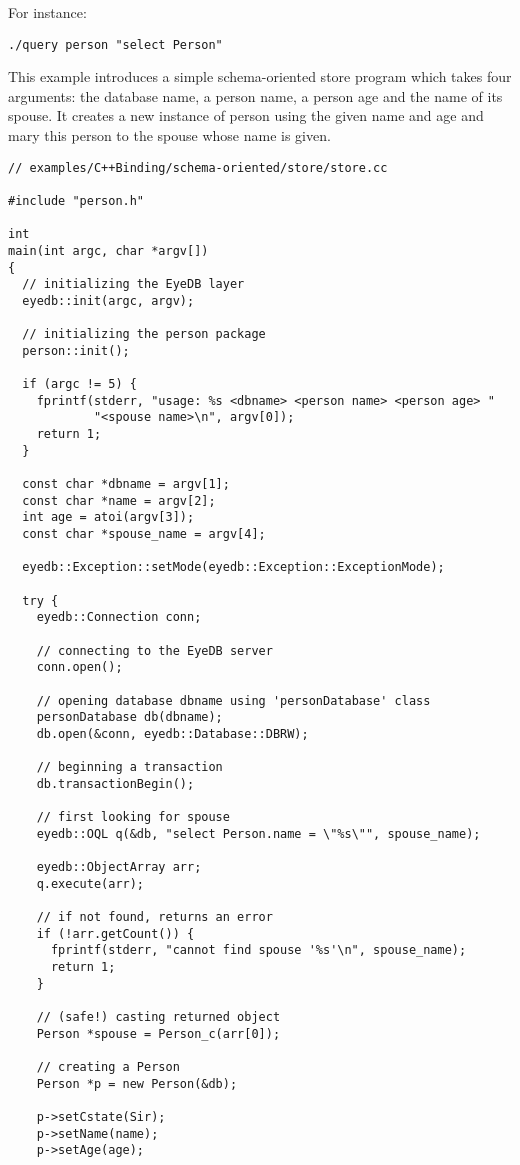 For instance:
\begin{verbatim}
./query person "select Person"
\end{verbatim}
\normalsize
{}
This example introduces a simple schema-oriented store program which takes
four arguments: the database name, a person name, a person age and the
name of its spouse. It
creates a new instance of person using the given name and age and mary
this person to the spouse whose name is given.
\verbsize
\begin{verbatim}
// examples/C++Binding/schema-oriented/store/store.cc

#include "person.h"

int
main(int argc, char *argv[])
{
  // initializing the EyeDB layer
  eyedb::init(argc, argv);

  // initializing the person package
  person::init();

  if (argc != 5) {
    fprintf(stderr, "usage: %
            "<spouse name>\n", argv[0]);
    return 1;
  }

  const char *dbname = argv[1];
  const char *name = argv[2];
  int age = atoi(argv[3]);
  const char *spouse_name = argv[4];

  eyedb::Exception::setMode(eyedb::Exception::ExceptionMode);

  try {
    eyedb::Connection conn;

    // connecting to the EyeDB server
    conn.open();

    // opening database dbname using 'personDatabase' class
    personDatabase db(dbname);
    db.open(&conn, eyedb::Database::DBRW);

    // beginning a transaction
    db.transactionBegin();

    // first looking for spouse
    eyedb::OQL q(&db, "select Person.name = \"%

    eyedb::ObjectArray arr;
    q.execute(arr);

    // if not found, returns an error
    if (!arr.getCount()) {
      fprintf(stderr, "cannot find spouse '%
      return 1;
    }

    // (safe!) casting returned object
    Person *spouse = Person_c(arr[0]);

    // creating a Person
    Person *p = new Person(&db);

    p->setCstate(Sir);
    p->setName(name);
    p->setAge(age);


\end{verbatim}
